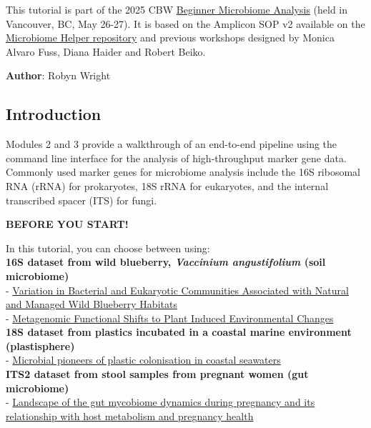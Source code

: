 \documentclass[
]{book}
\newenvironment{redbox}{
  \definecolor{shadecolor}{RGB}{243, 154, 157}
  \color{white}
  \begin{shaded}}
 {\end{shaded}}
\begin{document}
This tutorial is part of the 2025 CBW \href{https://bioinformaticsdotca.github.io/BMB_2025/}{Beginner Microbiome Analysis} (held in Vancouver, BC, May 26-27). It is based on the Amplicon SOP v2 available on the \href{https://github.com/LangilleLab/microbiome_helper/wiki/Amplicon-SOP-v2-(qiime2\%E2\%80\%902024.5)}{Microbiome Helper repository} and previous workshops designed by Monica Alvaro Fuss, Diana Haider and Robert Beiko.

\textbf{Author}: Robyn Wright

\subsection{Introduction}\label{introduction-1}

Modules 2 and 3 provide a walkthrough of an end-to-end pipeline using the command line interface for the analysis of high-throughput marker gene data. Commonly used marker genes for microbiome analysis include the 16S ribosomal RNA (rRNA) for prokaryotes, 18S rRNA for eukaryotes, and the internal transcribed spacer (ITS) for fungi.

\begin{redbox}

\begin{center}
\textbf{BEFORE YOU START!}

\end{center}

In this tutorial, you can choose between using:\\
\textbf{16S dataset from wild blueberry, \emph{Vaccinium angustifolium} (soil microbiome)}\\
- \href{https://apsjournals.apsnet.org/doi/10.1094/PBIOMES-03-17-0012-R}{Variation in Bacterial and Eukaryotic Communities Associated with Natural and Managed Wild Blueberry Habitats}\\
- \href{https://www.frontiersin.org/articles/10.3389/fmicb.2019.01682/full\#B50}{Metagenomic Functional Shifts to Plant Induced Environmental Changes}\\
\textbf{18S dataset from plastics incubated in a coastal marine environment (plastisphere)}\\
- \href{https://www.sciencedirect.com/science/article/pii/S0025326X22003836\#s0050}{Microbial pioneers of plastic colonisation in coastal seawaters}\\
\textbf{ITS2 dataset from stool samples from pregnant women (gut microbiome)}\\
- \href{https://gut.bmj.com/content/73/8/1302.long}{Landscape of the gut mycobiome dynamics during pregnancy and its relationship with host metabolism and pregnancy health}

\end{redbox}
\end{document}
